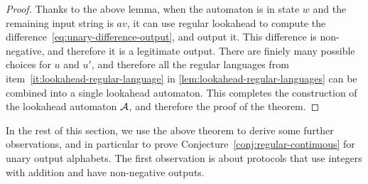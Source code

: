 \begin{proof}
Thanks to the above lemma, when the automaton is in state $w$ and the remaining input string is $av$, it can use regular lookahead to compute the difference~\eqref{eq:unary-difference-output}, and output it. This difference is non-negative, and therefore it is a legitimate output. There are finiely many possible choices for $u$ and $u'$, and therefore all  the regular languages from item~\ref{it:lookahead-regular-language} in \cref{lem:lookahead-regular-languages} can be combined into a single lookahead automaton. This completes the construction of the lookahead automaton ${\mathcal A}$, and therefore the proof of the theorem.
\end{proof}

In the rest of this section, we use the above theorem to derive some further observations, and in particular to prove Conjecture~\ref{conj:regular-continuous} for unary output alphabets. The first observation is about protocols that use integers with addition and have non-negative outputs.


